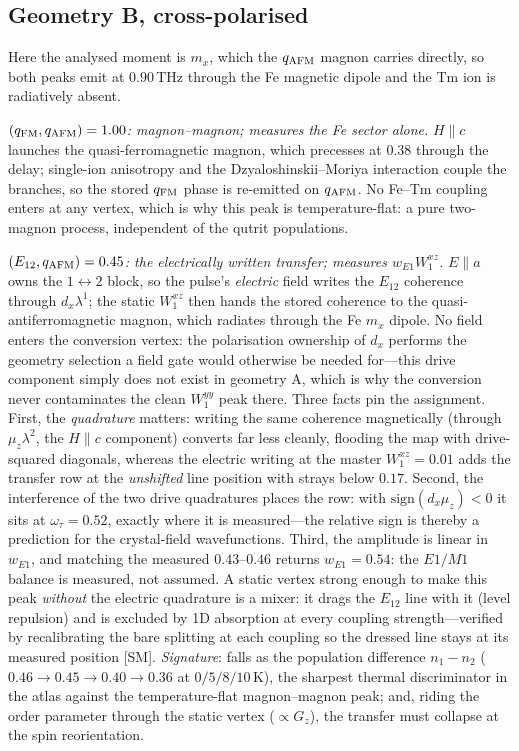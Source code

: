 \documentclass[aps,prb,twocolumn,superscriptaddress,longbibliography]{revtex4-2}
\newcommand{\qafm}{q_{\rm AFM}}
\newcommand{\qfm}{q_{\rm FM}}
\begin{document}
\subsection{Geometry B, cross-polarised}

Here the analysed moment is $m_x$, which the $\qafm$ magnon carries
directly, so both peaks emit at $0.90$\,THz through the Fe magnetic
dipole and the Tm ion is radiatively absent.

\emph{$(\qfm,\qafm)=1.00$: magnon--magnon; measures the Fe sector
alone.}  $H\!\parallel\!c$ launches the quasi-ferromagnetic magnon,
which precesses at $0.38$ through the delay; single-ion anisotropy and
the Dzyaloshinskii--Moriya interaction couple the branches, so the stored
$\qfm$ phase is re-emitted on $\qafm$.  No Fe--Tm coupling enters at any
vertex, which is why this peak is temperature-flat: a pure two-magnon
process, independent of the qutrit populations.

\emph{$(E_{12},\qafm)=0.45$: the electrically written transfer;
measures $w_{E1}W^{xz}_1$.}  $E\!\parallel\!a$ owns the
$1\!\leftrightarrow\!2$ block, so the pulse's \emph{electric} field
writes the $E_{12}$ coherence through $d_x\lambda^1$; the static
$W^{xz}_1$ then hands the stored coherence to the
quasi-antiferromagnetic magnon, which radiates through the Fe $m_x$
dipole.  No field enters the conversion vertex: the polarisation
ownership of $d_x$ performs the geometry selection a field gate would
otherwise be needed for---this drive component simply does not exist in
geometry A, which is why the conversion never contaminates the clean
$W^{yy}_1$ peak there.  Three facts pin the assignment.  First, the
\emph{quadrature} matters: writing the same coherence magnetically
(through $\mu_z\lambda^2$, the $H\!\parallel\!c$ component) converts far
less cleanly, flooding the map with drive-squared diagonals, whereas
the electric writing at the master $W^{xz}_1=0.01$ adds the transfer
row at the \emph{unshifted} line position with strays below $0.17$.
Second, the interference of the two drive quadratures places the row:
with $\mathrm{sign}(d_x\mu_z)<0$ it sits at $\omega_\tau=0.52$, exactly
where it is measured---the relative sign is thereby a prediction for
the crystal-field wavefunctions.  Third, the amplitude is linear in
$w_{E1}$, and matching the measured $0.43$--$0.46$ returns
$w_{E1}=0.54$: the $E1/M1$ balance is measured, not assumed.  A static
vertex strong enough to make this peak \emph{without} the electric
quadrature is a mixer: it drags the $E_{12}$ line with it (level
repulsion) and is excluded by 1D absorption at every coupling
strength---verified by recalibrating the bare splitting at each
coupling so the dressed line stays at its measured position [SM].
\emph{Signature}: falls as the population difference $n_1-n_2$
($0.46\to0.45\to0.40\to0.36$ at $0/5/8/10$\,K), the sharpest thermal
discriminator in the atlas against the temperature-flat magnon--magnon
peak; and, riding the order parameter through the static vertex
($\propto G_z$), the transfer must collapse at the spin reorientation.
\end{document}
